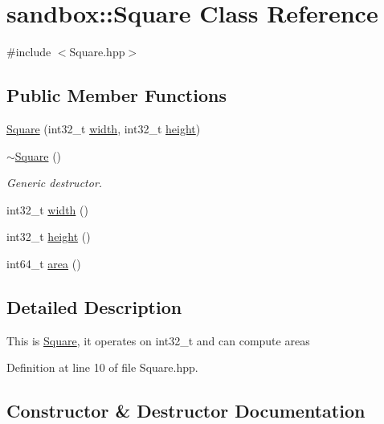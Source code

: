 \hypertarget{classsandbox_1_1_square}{}\section{sandbox\+::Square Class Reference}
\label{classsandbox_1_1_square}


{\ttfamily \#include $<$Square.\+hpp$>$}

\subsection*{Public Member Functions}
\begin{DoxyCompactItemize}
\item 
\mbox{\hyperlink{classsandbox_1_1_square_a05c6bb6c23749ae4616a77ed70210568}{Square}} (int32\+\_\+t \mbox{\hyperlink{classsandbox_1_1_square_a5f344e42d3d545919ca567101c49a027}{width}}, int32\+\_\+t \mbox{\hyperlink{classsandbox_1_1_square_a5053820765994fa8008415ebbad9a76e}{height}})
\item 
\mbox{\hyperlink{classsandbox_1_1_square_aae7383a5389f56686f955b85c0b5d330}{$\sim$\+Square}} ()
\begin{DoxyCompactList}\small\item\em Generic destructor. \end{DoxyCompactList}\item 
int32\+\_\+t \mbox{\hyperlink{classsandbox_1_1_square_a5f344e42d3d545919ca567101c49a027}{width}} ()
\item 
int32\+\_\+t \mbox{\hyperlink{classsandbox_1_1_square_a5053820765994fa8008415ebbad9a76e}{height}} ()
\item 
int64\+\_\+t \mbox{\hyperlink{classsandbox_1_1_square_a57844e085e500de30be917e1876cb4e6}{area}} ()
\end{DoxyCompactItemize}


\subsection{Detailed Description}
This is \mbox{\hyperlink{classsandbox_1_1_square}{Square}}, it operates on int32\+\_\+t and can compute areas 

Definition at line 10 of file Square.\+hpp.



\subsection{Constructor \& Destructor Documentation}
\mbox{\label{classsandbox_1_1_square_a05c6bb6c23749ae4616a77ed70210568}} 

